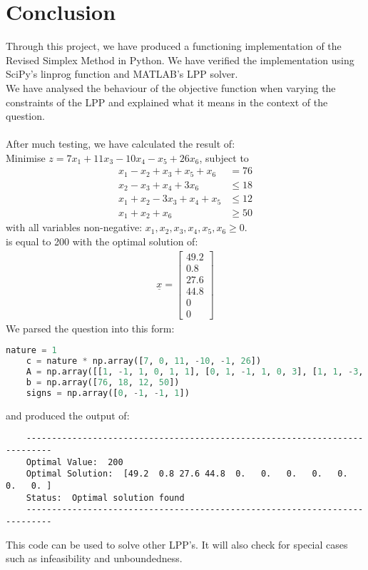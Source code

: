 \documentclass{article}
\numberwithin{equation}{section}
\begin{document}
\section{Conclusion}
Through this project, we have produced a functioning implementation of the Revised Simplex Method in Python.
We have verified the implementation using SciPy's linprog function and MATLAB's LPP solver.\\
We have analysed the behaviour of the objective function when varying the constraints of the LPP and explained what it means in the context of the question.\\ \\
After much testing, we have calculated the result of: \\
Minimise $z = 7x_1 + 11x_3 - 10x_4 - x_5 + 26x_6$, subject to
\begin{align}
    x_1 - x_2 + x_3 + x_5 + x_6 &= 76 \\
    x_2 - x_3 + x_4 + 3x_6 &\leq 18 \\
    x_1 + x_2 - 3x_3 + x_4 + x_5 &\leq 12 \\
    x_1 + x_2 + x_6 &\geq 50
\end{align}
with all variables non-negative: $x_1, x_2, x_3, x_4, x_5, x_6 \geq 0$. \\ 
is equal to 200 with the optimal solution of:
\begin{align}
    \underline{x} = \begin{bmatrix}
        49.2 \\
        0.8 \\
        27.6 \\
        44.8 \\
        0 \\
        0
    \end{bmatrix}
\end{align}
We parsed the question into this form: \\
\begin{lstlisting}[language=Python, basicstyle=\scriptsize, frame=single]
    nature = 1
    c = nature * np.array([7, 0, 11, -10, -1, 26])
    A = np.array([[1, -1, 1, 0, 1, 1], [0, 1, -1, 1, 0, 3], [1, 1, -3, 1, 1, 0], [1, 1, 0, 0, 0, 1]])
    b = np.array([76, 18, 12, 50])
    signs = np.array([0, -1, -1, 1])
\end{lstlisting}
and produced the output of:
\begin{lstlisting}
    ---------------------------------------------------------------------------
    Optimal Value:  200
    Optimal Solution:  [49.2  0.8 27.6 44.8  0.   0.   0.   0.   0.   0.   0. ]
    Status:  Optimal solution found
    ---------------------------------------------------------------------------
\end{lstlisting}
This code can be used to solve other LPP's. It will also check for special cases such as infeasibility and unboundedness. \\
\end{document}
